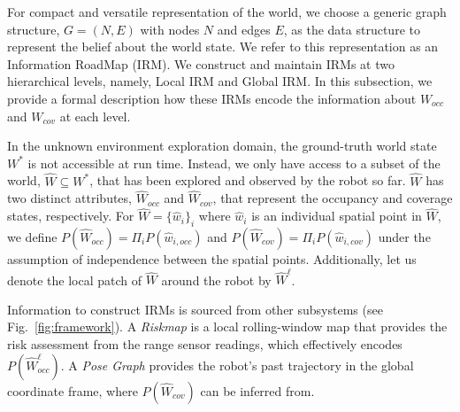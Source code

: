 \documentclass[letterpaper]{article} %
\newcommand{\phdone}[1]{} %
\begin{document}
%


\phdone{Data structure}
For compact and versatile representation of the world, we choose a generic graph structure, $G = (N, E)$ with nodes $N$ and edges $E$, as the data structure to represent the belief about the world state.
We refer to this representation as an Information RoadMap (IRM).
We construct and maintain IRMs at two hierarchical levels, namely, Local IRM and Global IRM.
In this subsection, we provide a formal description how these IRMs encode the information about $W_{occ}$ and $W_{cov}$ at each level.


\phdone{Formulation}
In the unknown environment exploration domain, the ground-truth world state $W^*$ is not accessible at run time.
Instead, we only have access to a subset of the world, $\hat{W} \subseteq W^*$, that has been explored and observed by the robot so far.
$\hat{W}$ has two distinct attributes, $\hat{W}_{occ}$ and $\hat{W}_{cov}$, that represent the occupancy and coverage states, respectively.
%
For $\hat{W} = \{\hat{w}_i\}_i$ where $\hat{w}_i$ is an individual spatial point in $\hat{W}$, we define $P(\hat{W}_{occ}) = \Pi_i P(\hat{w}_{i,occ})$ and $P(\hat{W}_{cov}) = \Pi_i P(\hat{w}_{i,cov})$ under the assumption of independence between the spatial points.
Additionally, let us denote the local patch of $\hat{W}$ around the robot by $\hat{W}^\ell$.
%
%


\phdone{Information Sources}
Information to construct IRMs is sourced from other subsystems (see Fig.~\ref{fig:framework}).
A \textit{Riskmap} is a local rolling-window map that provides the risk assessment from the range sensor readings, %
which effectively encodes $P(\hat{W}^\ell_{occ})$.
A \textit{Pose Graph} %
provides the robot's past trajectory in the global coordinate frame, where $P(\hat{W}_{cov})$ can be inferred from.
\end{document}
